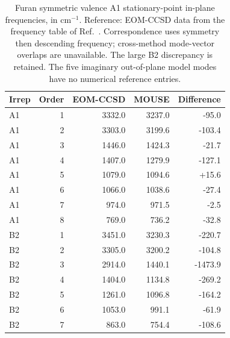 \begin{table}[!htbp]
\centering\small
\caption{Furan symmetric valence A1 stationary-point in-plane frequencies, in cm$^{-1}$. Reference: EOM-CCSD data from the frequency table of Ref.~. Correspondence uses symmetry then descending frequency; cross-method mode-vector overlaps are unavailable. The large B2 discrepancy is retained. The five imaginary out-of-plane model modes have no numerical reference entries.}\label{tab:furanphysical}
\begin{tabular}{lrrrr}
\toprule
Irrep & Order & EOM-CCSD & MOUSE & Difference \\
\midrule
A1 & 1 & 3332.0 & 3237.0 & -95.0 \\
A1 & 2 & 3303.0 & 3199.6 & -103.4 \\
A1 & 3 & 1446.0 & 1424.3 & -21.7 \\
A1 & 4 & 1407.0 & 1279.9 & -127.1 \\
A1 & 5 & 1079.0 & 1094.6 & +15.6 \\
A1 & 6 & 1066.0 & 1038.6 & -27.4 \\
A1 & 7 & 974.0 & 971.5 & -2.5 \\
A1 & 8 & 769.0 & 736.2 & -32.8 \\
B2 & 1 & 3451.0 & 3230.3 & -220.7 \\
B2 & 2 & 3305.0 & 3200.2 & -104.8 \\
B2 & 3 & 2914.0 & 1440.1 & -1473.9 \\
B2 & 4 & 1404.0 & 1134.8 & -269.2 \\
B2 & 5 & 1261.0 & 1096.8 & -164.2 \\
B2 & 6 & 1053.0 & 991.1 & -61.9 \\
B2 & 7 & 863.0 & 754.4 & -108.6 \\
\bottomrule
\end{tabular}
\end{table}
